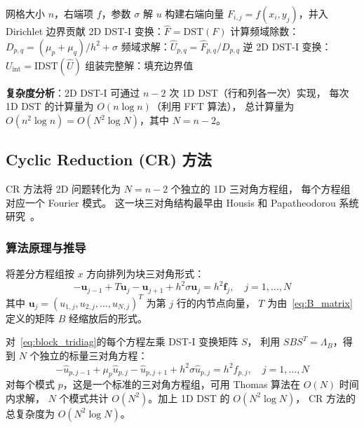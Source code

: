 \begin{algorithm}
\caption{FA 方法求解离散 Poisson/Helmholtz 方程（Dirichlet BC）}
\begin{algorithmic}[1]
\REQUIRE 网格大小 $n$，右端项 $f$，参数 $\sigma$
\ENSURE 解 $u$
\STATE 构建右端向量 $F_{i,j} = f(x_i, y_j)$，并入 Dirichlet 边界贡献
\STATE 2D DST-I 变换：$\hat{F} = \mathrm{DST}(F)$
\STATE 计算频域除数：$D_{p,q} = (\mu_p + \mu_q)/h^2 + \sigma$
\STATE 频域求解：$\hat{U}_{p,q} = \hat{F}_{p,q} / D_{p,q}$
\STATE 逆 2D DST-I 变换：$U_{\mathrm{int}} = \mathrm{IDST}(\hat{U})$
\STATE 组装完整解：填充边界值
\end{algorithmic}
\end{algorithm}

\textbf{复杂度分析}：2D DST-I 可通过 $n-2$ 次 1D DST（行和列各一次）实现，
每次 1D DST 的计算量为 $O(n \log n)$（利用 FFT 算法），
总计算量为 $O(n^2 \log n) = O(N^2 \log N)$，其中 $N = n - 2$。

\subsection{Cyclic Reduction (CR) 方法}

CR 方法将 2D 问题转化为 $N = n-2$ 个独立的 1D 三对角方程组，
每个方程组对应一个 Fourier 模式。
这一块三对角结构最早由 Housis 和 Papatheodorou 系统研究~\cite{HoustisPapatheodorou1979a}。

\subsubsection{算法原理与推导}

将差分方程组按 $x$ 方向排列为块三对角形式：
\begin{equation}
  -\mathbf{u}_{j-1} + T\mathbf{u}_j - \mathbf{u}_{j+1} + h^2 \sigma \mathbf{u}_j = h^2 \mathbf{f}_j, \quad j = 1, \ldots, N
  \label{eq:block_tridiag}
\end{equation}
其中 $\mathbf{u}_j = (u_{1,j}, u_{2,j}, \ldots, u_{N,j})^T$ 为第 $j$ 行的内节点向量，
$T$ 为由~\eqref{eq:B_matrix}定义的矩阵 $B$ 经缩放后的形式。

对~\eqref{eq:block_tridiag}的每个方程左乘 DST-I 变换矩阵 $S$，
利用 $SBS^T = \Lambda_B$，得到 $N$ 个独立的标量三对角方程：
\begin{equation}
  -\hat{u}_{p,j-1} + \mu_p \hat{u}_{p,j} - \hat{u}_{p,j+1} + h^2 \sigma \hat{u}_{p,j}
  = h^2 \hat{f}_{p,j}, \quad j = 1, \ldots, N
  \label{eq:mode_tridiag}
\end{equation}
对每个模式 $p$，这是一个标准的三对角方程组，可用 Thomas 算法在 $O(N)$ 时间内求解，
$N$ 个模式共计 $O(N^2)$。加上 1D DST 的 $O(N^2 \log N)$，
CR 方法的总复杂度为 $O(N^2 \log N)$。

